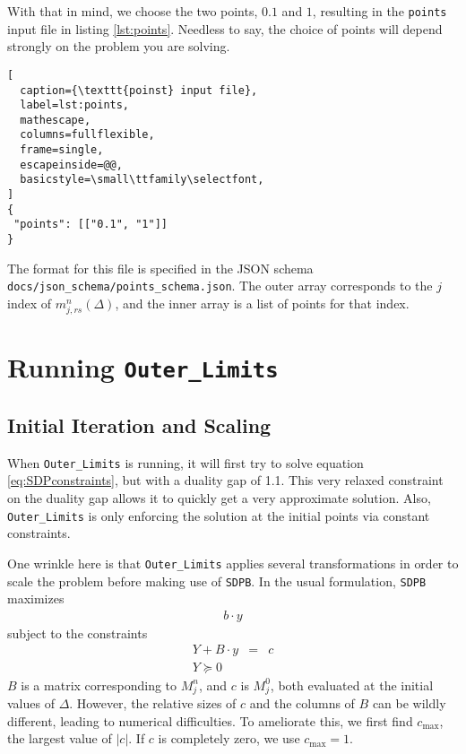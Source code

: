 \documentclass[12pt]{article}
\numberwithin{equation}{section}
\begin{document}
With that in mind, we choose the two points, $0.1$ and $1$,
resulting in the \texttt{points} input file in listing \ref{lst:points}.
Needless to say, the choice of points will depend strongly on the
problem you are solving.

\begin{lstlisting}[
  caption={\texttt{poinst} input file},
  label=lst:points,
  mathescape,
  columns=fullflexible,
  frame=single,
  escapeinside=@@,
  basicstyle=\small\ttfamily\selectfont,
]
{
 "points": [["0.1", "1"]]
}
\end{lstlisting}

The format for this file is specified in the JSON schema
\texttt{docs/json_schema/points\_schema.json}. The outer array corresponds to the
$j$ index of $m_{j,rs}^{n}(\Delta)$, and the inner array is a list
of points for that index.

\section{Running \texttt{Outer\_Limits}}
\label{sec:running}

\subsection{Initial Iteration and Scaling}
\label{subsec:initial}

When \texttt{Outer\_Limits} is running, it will first try to solve
equation \ref{eq:SDPconstraints}, but with a duality gap of 1.1.  This
very relaxed constraint on the duality gap allows it to quickly get a
very approximate solution.  Also, \texttt{Outer\_Limits} is only
enforcing the solution at the initial points via constant constraints.

One wrinkle here is that \texttt{Outer\_Limits} applies several
transformations in order to scale the problem before making use of
\texttt{SDPB}.  In the usual formulation, \texttt{SDPB} maximizes
\begin{eqnarray}
  b\cdot y
  \label{eq:bdy}
\end{eqnarray}
subject to the constraints
\begin{eqnarray}
  Y + B\cdot y & = & c\\
  \label{eq:YByc}
  Y \succeq 0
  \label{eq:Ysucceq0}
\end{eqnarray}
$B$ is a matrix corresponding to $M^n_j$, and $c$ is $M^0_j$, both evaluated
at the initial values of $\Delta$.  However, the relative sizes
of $c$ and the columns of $B$ can be wildly different, leading to
numerical difficulties.  To ameliorate this, we first find $c_{\max}$,
the largest value of $|c|$.  If $c$ is completely zero, we use
$c_{\max}=1$.
\end{document}
